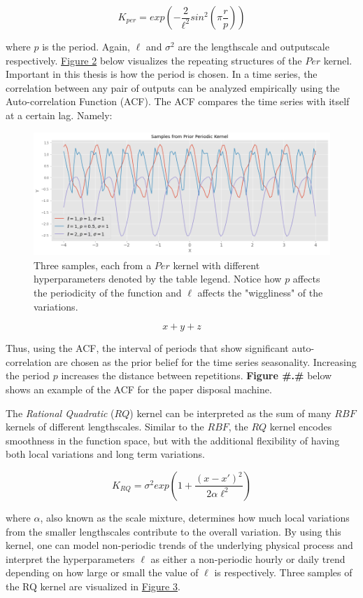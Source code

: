 $$K_{per} = exp(-\frac{2}{\ell^2} sin^2 (\pi \frac{r}{p}))$$

where $p$ is the period. Again, $\ell$ and $\sigma^2$ are the lengthscale and outputscale respectively. \hyperlink{figure.2}{Figure 2} below visualizes the repeating structures of the $Per$ kernel. Important in this thesis is how the period is chosen. In a time series, the correlation between any pair of outputs can be analyzed empirically using the Auto-correlation Function (ACF). The ACF compares the time series with itself at a certain lag. Namely:

\begin{figure}[htp]
\centering
\graphicspath{ {./images/} }
\includegraphics[scale=0.49]{images/samples_periodic_prior.png}
\caption{Three samples, each from a $Per$ kernel with different hyperparameters denoted by the table legend. Notice how $p$ affects the periodicity of the function and $\ell$ affects the "wiggliness" of the variations.}
\end{figure}

$$x + y + z$$

Thus, using the ACF, the interval of periods that show significant auto-correlation are chosen as the prior belief for the time series seasonality. Increasing the period $p$ increases the distance between repetitions. \textbf{Figure #.#} below shows an example of the ACF for the paper disposal machine.

The \textit{Rational Quadratic} ($RQ$) kernel can be interpreted as the sum of many $RBF$ kernels of different lengthscales. Similar to the $RBF$, the $RQ$ kernel encodes smoothness in the function space, but with the additional flexibility of having both local variations and long term variations. 

$$K_{RQ} = \sigma^2 exp(1 + \frac{(x - x')^2}{2\alpha \ell^2})$$

where $\alpha$, also known as the scale mixture, determines how much local variations from the smaller lengthscales contribute to the overall variation. By using this kernel, one can model non-periodic trends of the underlying physical process and interpret the hyperparameters $\ell$ as either a non-periodic hourly or daily trend depending on how large or small the value of $\ell$ is respectively. Three samples of the RQ kernel are visualized in \hyperlink{figure.3}{Figure 3}.

